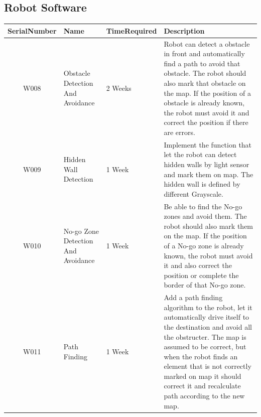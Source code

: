 \documentclass[11pt, a4paper]{report}
\begin{document}
\subsection{Robot Software}
\begin{tabular}{|c|p{2.3cm}|p{3cm}|p{7cm}|}%
\hline
SerialNumber     &	Name 	&	TimeRequired		&	Description	
								\\ \hline
W008		&	Obstacle Detection And Avoidance & 2 Weeks	& Robot can detect a obstacle in front and automatically find a path to avoid that obstacle. The robot should also mark that obstacle on the map. If the position of a obstacle is already known, the robot must avoid it and correct the position if there are errors. \\ \hline
W009  &  Hidden Wall Detection & 1 Week & Implement the function that let the robot can detect hidden walls by light sensor and mark them on map. The hidden wall is defined by different Grayscale.\\ \hline 
W010 & No-go Zone Detection And Avoidance & 1 Week & Be able to find the No-go zones and avoid them. The robot should also mark them on the map. If the position of a No-go zone is already known, the robot must avoid it and also correct the position or complete the border of that No-go zone.\\  \hline
W011 & Path Finding & 1 Week & Add a path finding algorithm to the robot, let it automatically drive itself to the destination and avoid all the obstructer. The map is assumed to be correct, but when the robot finds an element that is not correctly marked on map it should correct it and recalculate path according to the new map.\\ \hline
\end{tabular}


\end{document}
